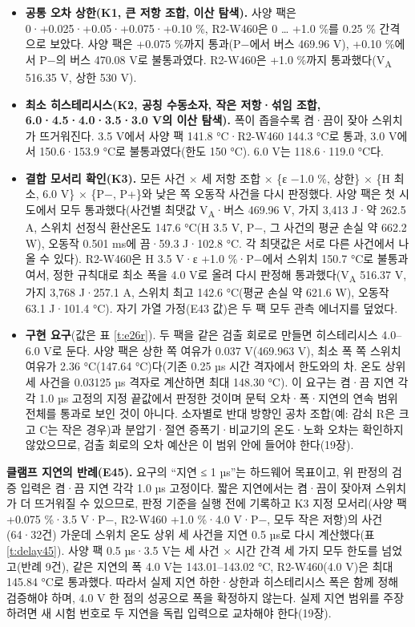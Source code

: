 \begin{itemize}
\item \textbf{공통 오차 상한(K1, 큰 저항 조합, 이산 탐색).} 사양 팩은 0·+0.025·+0.05·+0.075·+0.10 \%, R2-W460은 0 … +1.0 \%를 0.25 \% 간격으로 보았다. 사양 팩은 +0.075 \%까지 통과(P−에서 버스 469.96 V), +0.10 \%에서 P−의 버스 470.08 V로 불통과였다. R2-W460은 +1.0 \%까지 통과했다(V\textsubscript{A} 516.35 V, 상한 530 V).
\item \textbf{최소 히스테리시스(K2, 공칭 수동소자, 작은 저항·섞임 조합, 6.0·4.5·4.0·3.5·3.0 V의 이산 탐색).} 폭이 좁을수록 켬·끔이 잦아 스위치가 뜨거워진다. 3.5 V에서 사양 팩 141.8 °C·R2-W460 144.3 °C로 통과, 3.0 V에서 150.6·153.9 °C로 불통과였다(한도 150 °C). 6.0 V는 118.6·119.0 °C다.
\item \textbf{결합 모서리 확인(K3).} 모든 사건 × 세 저항 조합 × \{ε −1.0 \%, 상한\} × \{H 최소, 6.0 V\} × \{P−, P+\}와 낮은 쪽 오동작 사건을 다시 판정했다. 사양 팩은 첫 시도에서 모두 통과했다(사건별 최댓값 V\textsubscript{A}·버스 469.96 V, 가지 3,413 J·약 262.5 A, 스위치 선정식 환산온도 147.6 °C(H 3.5 V, P−, 그 사건의 평균 손실 약 662.2 W), 오동작 0.501 ms에 끔·59.3 J·102.8 °C. 각 최댓값은 서로 다른 사건에서 나올 수 있다). R2-W460은 H 3.5 V·ε +1.0 \%·P−에서 스위치 150.7 °C로 불통과여서, 정한 규칙대로 최소 폭을 4.0 V로 올려 다시 판정해 통과했다(V\textsubscript{A} 516.37 V, 가지 3,768 J·257.1 A, 스위치 최고 142.6 °C(평균 손실 약 621.6 W), 오동작 63.1 J·101.4 °C). 자기 가열 가정(E43 값)은 두 팩 모두 관측 에너지를 덮었다.
\item \textbf{구현 요구}(값은 표 \ref{t:e26r}). 두 팩을 같은 검출 회로로 만들면 히스테리시스 4.0–6.0 V로 둔다. 사양 팩은 상한 쪽 여유가 0.037 V(469.963 V), 최소 폭 쪽 스위치 여유가 2.36 °C(147.64 °C)다(기존 0.25 µs 시간 격자에서 한도와의 차. 온도 상위 세 사건을 0.03125 µs 격자로 계산하면 최대 148.30 °C). 이 요구는 켬·끔 지연 각각 1.0 µs 고정의 지정 끝값에서 판정한 것이며 문턱 오차·폭·지연의 연속 범위 전체를 통과로 보인 것이 아니다. 소자별로 반대 방향인 공차 조합(예: 감쇠 R은 크고 C는 작은 경우)과 분압기·절연 증폭기·비교기의 온도·노화 오차는 확인하지 않았으므로, 검출 회로의 오차 예산은 이 범위 안에 들어야 한다(19장).
\end{itemize}

\textbf{클램프 지연의 반례(E45).} 요구의 “지연 ≤ 1 µs”는 하드웨어 목표이고, 위 판정의 검증 입력은 켬·끔 지연 각각 1.0 µs 고정이다. 짧은 지연에서는 켬·끔이 잦아져 스위치가 더 뜨거워질 수 있으므로, 판정 기준을 실행 전에 기록하고 K3 지정 모서리(사양 팩 +0.075 \%·3.5 V·P−, R2-W460 +1.0 \%·4.0 V·P−, 모두 작은 저항)의 사건(64·32건) 가운데 스위치 온도 상위 세 사건을 지연 0.5 µs로 다시 계산했다(표 \ref{t:delay45}). 사양 팩 0.5 µs·3.5 V는 세 사건 × 시간 간격 세 가지 모두 한도를 넘었고(반례 9건), 같은 지연의 폭 4.0 V는 143.01–143.02 °C, R2-W460(4.0 V)은 최대 145.84 °C로 통과했다. 따라서 실제 지연 하한·상한과 히스테리시스 폭은 함께 정해 검증해야 하며, 4.0 V 한 점의 성공으로 폭을 확정하지 않는다. 실제 지연 범위를 주장하려면 새 시험 번호로 두 지연을 독립 입력으로 교차해야 한다(19장).

